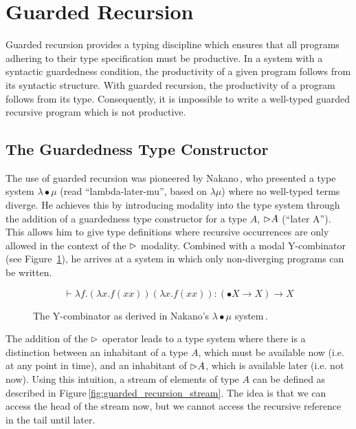 
\section{Guarded Recursion}
\label{sec:guarded-recursion}

Guarded recursion provides a typing discipline which ensures that all programs adhering to their type specification must be productive. In a system with a syntactic guardedness condition, the productivity of a given program follows from its syntactic structure. With guarded recursion, the productivity of a program follows from its type. Consequently, it is impossible to write a well-typed guarded recursive program which is not productive.

\subsection{The Guardedness Type Constructor}
The use of guarded recursion was pioneered by Nakano\,\citep{Nakano:2000}, who
presented a type system $\lambda\!\bullet\!\mu$ (read ``lambda-later-mu'', based
on $\lambda \mu$) where no well-typed terms diverge. He achieves this by
introducing modality into the type system through the addition of a guardedness
type constructor for a type $A$, $\rhd A$ (``later A''). This allows him to
give type definitions where
recursive occurrences are only allowed in the context of the $\rhd$
modality. Combined with a modal Y-combinator (see
Figure~\ref{fig:nakano_Y}), he arrives at a system in which only non-diverging
programs can be written.

\begin{figure}[H]
\[
\vdash \lambda f. (\lambda x. f (x x)) (\lambda x. f (x x)) : (\bullet X \to X) \to X
\]
\caption{The Y-combinator as derived in Nakano's $\lambda\!\bullet\!\mu$ system\,\citep{Nakano:2000}.}
\label{fig:nakano_Y}
\end{figure}

The addition of the $\rhd$ operator leads to a type system where there is a distinction between an inhabitant of a type $A$, which must be available now (i.e. at any point in time), and an inhabitant of $\rhd A$, which is available later (i.e. not now). Using this intuition, a stream of elements of type $A$ can be defined as described in Figure\,\ref{fig:guarded_recursion_stream}. The idea is that we can access the head of the stream now, but we cannot access the recursive reference in the tail until later.


